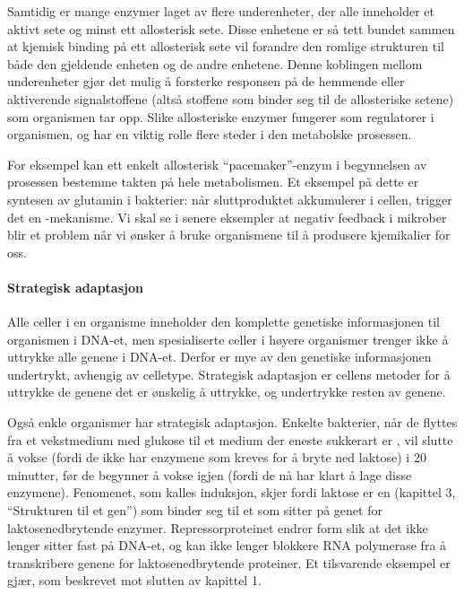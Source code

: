 Samtidig er mange enzymer laget av flere underenheter, der alle inneholder et aktivt sete og minst ett allosterisk sete. Disse enhetene er så tett bundet sammen at kjemisk binding på ett allosterisk sete vil forandre den romlige strukturen til både den gjeldende enheten og de andre enhetene. Denne koblingen mellom underenheter gjør det mulig å forsterke responsen på de hemmende eller aktiverende signalstoffene (altså stoffene som binder seg til de allosteriske setene) som organismen tar opp. Slike allosteriske enzymer fungerer som regulatorer i organismen, og har en viktig rolle flere steder i den metabolske prosessen.

For eksempel kan ett enkelt allosterisk ``pacemaker''-enzym i begynnelsen av prosessen bestemme takten på hele metabolismen. Et eksempel på dette er syntesen av glutamin i bakterier: når sluttproduktet akkumulerer i cellen, trigger det en -mekanisme. Vi skal se i senere eksempler at negativ feedback i mikrober blir et problem når vi ønsker å bruke organismene til å produsere kjemikalier for oss.

\paragraph{Strategisk adaptasjon} Alle celler i en organisme inneholder den komplette genetiske informasjonen til organismen i DNA-et, men spesialiserte celler i høyere organismer trenger ikke å uttrykke alle genene i DNA-et. Derfor er mye av den genetiske informasjonen undertrykt, avhengig av celletype. Strategisk adaptasjon er cellens metoder for å uttrykke de genene det er ønskelig å uttrykke, og undertrykke resten av genene.

Også enkle organismer har strategisk adaptasjon. Enkelte bakterier, når de flyttes fra et vekstmedium med glukose til et medium der eneste sukkerart er , vil slutte å vokse (fordi de ikke har enzymene som kreves for å bryte ned laktose) i 20 minutter, før de begynner å vokse igjen (fordi de nå har klart å lage disse enzymene). Fenomenet, som kalles induksjon, skjer fordi laktose er en  (kapittel 3, ``Strukturen til et gen'') som binder seg til et som sitter på genet for laktosenedbrytende enzymer. Repressorproteinet endrer form slik at det ikke lenger sitter fast på DNA-et, og kan ikke lenger blokkere RNA polymerase fra å transkribere genene for laktosenedbrytende proteiner. Et tilsvarende eksempel er gjær, som beskrevet mot slutten av kapittel 1.

